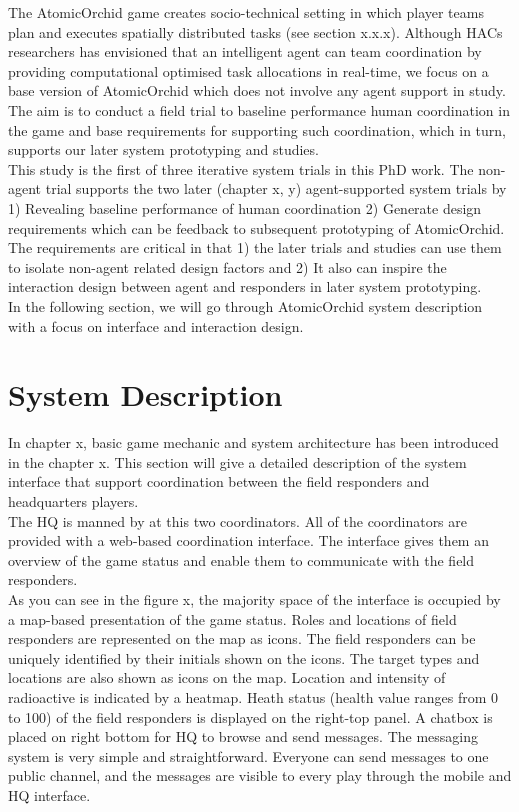 The AtomicOrchid game creates socio-technical setting in which player teams plan and executes spatially distributed tasks (see section x.x.x). Although HACs researchers has envisioned that an intelligent agent can team coordination by providing computational optimised task allocations in real-time, we focus on a base version of AtomicOrchid which does not involve any agent support in study. The aim is to conduct a field trial to baseline performance human coordination in the game and base requirements for supporting such coordination, which in turn, supports our later system prototyping and studies. \\

This study is the first of three iterative system trials in this PhD work. The non-agent trial supports the two later (chapter x, y) agent-supported system trials by 1) Revealing baseline performance of human coordination 2) Generate design requirements which can be feedback to subsequent prototyping of AtomicOrchid. The requirements are critical in that 1) the later trials and studies can use them to isolate non-agent related design factors and 2) It also can inspire the interaction design between agent and responders in later system prototyping.  \\

In the following section, we will go through AtomicOrchid system description with a focus on interface and interaction design.\\

\section{System Description}
In chapter x, basic game mechanic and system architecture has been introduced in the chapter x. This section will give a detailed description of the system interface that support coordination between the field responders and headquarters players. \\

The HQ is manned by at this two coordinators. All of the coordinators are provided with a web-based coordination interface. The interface gives them an overview of the game status and enable them to communicate with the field responders. \\


As you can see in the figure x, the majority space of the interface is occupied by a map-based presentation of the game status. Roles and locations of field responders are represented on the map as icons. The field responders can be uniquely identified by their initials shown on the icons. The target types and locations are also shown as icons on the map. Location and intensity of radioactive is indicated by a heatmap. Heath status (health value ranges from 0 to 100) of the field responders is displayed on the right-top panel. A chatbox is placed on right bottom for HQ to browse and send messages. The messaging system is very simple and straightforward. Everyone can send messages to one public channel, and the messages are visible to every play through the mobile and HQ interface.\\


